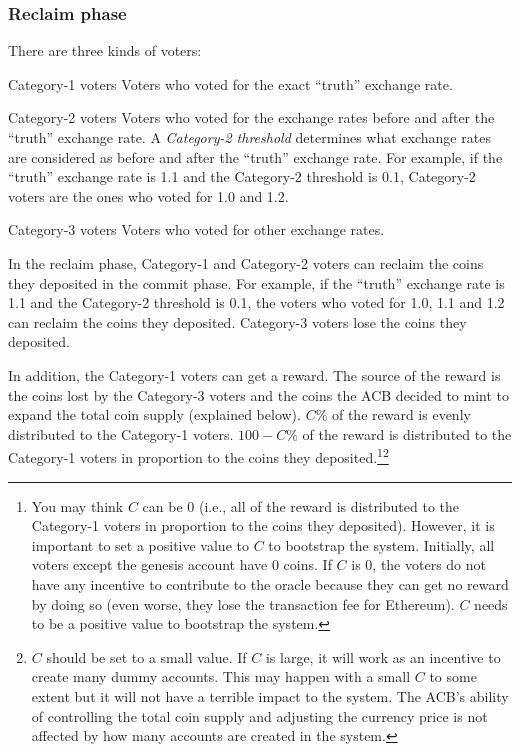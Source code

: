 \documentclass[dvipdfmx,a4paper]{article}
\begin{document}
\subsubsection{Reclaim phase}

There are three kinds of voters:

\begin{description}
\item{Category-1 voters} Voters who voted for the exact ``truth'' exchange rate.
\item{Category-2 voters} Voters who voted for the exchange rates before and after the ``truth'' exchange rate. A \textit{Category-2 threshold} determines what exchange rates are considered as before and after  the ``truth'' exchange rate. For example, if the ``truth'' exchange rate is 1.1 and the Category-2 threshold is 0.1, Category-2 voters are the ones who voted for 1.0 and 1.2.
\item{Category-3 voters} Voters who voted for other exchange rates.
\end{description}

In the reclaim phase, Category-1 and Category-2 voters can reclaim the coins they deposited in the commit phase. For example, if the ``truth'' exchange rate is 1.1 and the Category-2 threshold is 0.1, the voters who voted for 1.0, 1.1 and 1.2 can reclaim the coins they deposited. Category-3 voters lose the coins they deposited.

In addition, the Category-1 voters can get a reward. The source of the reward is the coins lost by the Category-3 voters and the coins the ACB decided to mint to expand the total coin supply (explained below). $C$\% of the reward is evenly distributed to the Category-1 voters. $100-C$\% of the reward is distributed to the Category-1 voters in proportion to the coins they deposited.\footnote{You may think $C$ can be 0 (i.e., all of the reward is distributed to the Category-1 voters in proportion to the coins they deposited). However, it is important to set a positive value to $C$ to bootstrap the system. Initially, all voters except the genesis account have 0 coins. If $C$ is 0, the voters do not have any incentive to contribute to the oracle because they can get no reward by doing so (even worse, they lose the transaction fee for Ethereum). $C$ needs to be a positive value to bootstrap the system.}\footnote{$C$ should be set to a small value. If $C$ is large, it will work as an incentive to create many dummy accounts. This may happen with a small $C$ to some extent but it will not have a terrible impact to the system. The ACB's ability of controlling the total coin supply and adjusting the currency price is not affected by how many accounts are created in the system.}
\end{document}
